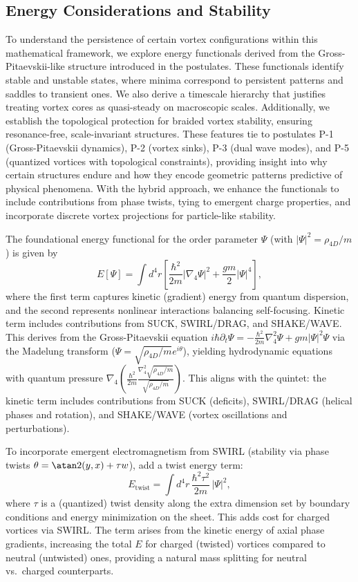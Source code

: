 \subsection{Energy Considerations and Stability}

To understand the persistence of certain vortex configurations within this mathematical framework, we explore energy functionals derived from the Gross-Pitaevskii-like structure introduced in the postulates. These functionals identify stable and unstable states, where minima correspond to persistent patterns and saddles to transient ones. We also derive a timescale hierarchy that justifies treating vortex cores as quasi-steady on macroscopic scales. Additionally, we establish the topological protection for braided vortex stability, ensuring resonance-free, scale-invariant structures. These features tie to postulates P-1 (Gross-Pitaevskii dynamics), P-2 (vortex sinks), P-3 (dual wave modes), and P-5 (quantized vortices with topological constraints), providing insight into why certain structures endure and how they encode geometric patterns predictive of physical phenomena. With the hybrid approach, we enhance the functionals to include contributions from phase twists, tying to emergent charge properties, and incorporate discrete vortex projections for particle-like stability.

The foundational energy functional for the order parameter $\Psi$ (with $|\Psi|^2 = \rho_{4D}/m$) is given by
\begin{equation}
E[\Psi] = \int d^4 r \left[ \frac{\hbar^2}{2m} |\nabla_4 \Psi|^2 + \frac{g m}{2} |\Psi|^4 \right],
\end{equation}
where the first term captures kinetic (gradient) energy from quantum dispersion, and the second represents nonlinear interactions balancing self-focusing. Kinetic term includes contributions from SUCK, SWIRL/DRAG, and SHAKE/WAVE. This derives from the Gross-Pitaevskii equation $i \hbar \partial_t \Psi = -\frac{\hbar^2}{2 m} \nabla_4^2 \Psi + g m |\Psi|^2 \Psi$ via the Madelung transform ($\Psi = \sqrt{\rho_{4D}/m} e^{i \theta}$), yielding hydrodynamic equations with quantum pressure $\nabla_4 \left( \frac{\hbar^2}{2 m} \frac{\nabla_4^2 \sqrt{\rho_{4D}/m}}{\sqrt{\rho_{4D}/m}} \right)$. This aligns with the quintet: the kinetic term includes contributions from SUCK (deficits), SWIRL/DRAG (helical phases and rotation), and SHAKE/WAVE (vortex oscillations and perturbations).

To incorporate emergent electromagnetism from SWIRL (stability via phase twists $\theta = \atan2(y, x) + \tau w$), add a twist energy term:
\begin{equation}
E_{\text{twist}} = \int d^4 r \, \frac{\hbar^2 \tau^2}{2m} \, |\Psi|^2,
\end{equation}
where $\tau$ is a (quantized) twist density along the extra dimension set by boundary conditions and energy minimization on the sheet. This adds cost for charged vortices via SWIRL. The term arises from the kinetic energy of axial phase gradients, increasing the total $E$ for charged (twisted) vortices compared to neutral (untwisted) ones, providing a natural mass splitting for neutral vs.\ charged counterparts.

